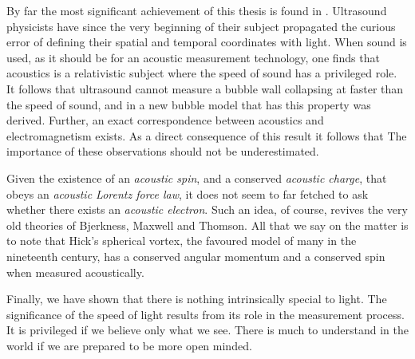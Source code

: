 By far the most significant achievement of this thesis is found in .
Ultrasound physicists have since the very beginning of their subject propagated the curious
error of defining their spatial and temporal coordinates with light.
When sound is used, 
as it should be for an acoustic measurement technology,
one finds that acoustics is a relativistic subject where the speed of sound has a privileged role.
It follows that ultrasound cannot measure a bubble wall collapsing at faster than the speed of sound,
and in  a new bubble model that has this property was derived.
Further, an exact correspondence between acoustics and electromagnetism exists.
As a direct consequence of this result it follows that 
The importance of these observations should not be underestimated.

Given the existence of an {\em acoustic spin},  and a conserved {\em acoustic charge},
that obeys an {\em acoustic Lorentz force law},
it does not seem to far fetched to ask whether there exists an {\em acoustic electron}.
Such an idea, of course, 
revives the very old theories of Bjerkness\cite{Bjerknes1905}, Maxwell\cite{Maxwell1861} and Thomson\cite{Thomson1931}.
All that we say on the matter is to note that 
Hick's spherical vortex, the favoured model of many in the nineteenth century,
has a conserved angular momentum\cite{Pekeris1976,Pekeris1977} and a conserved spin\cite{Moffatt1969,Moffatt1988}
when measured acoustically.

Finally, 
we have shown that there is nothing intrinsically special to light.
The significance of the speed of light results from its  role in the measurement process.
It is privileged if we believe only what we see.
There is much to understand in the world if we are prepared to be more open minded.



